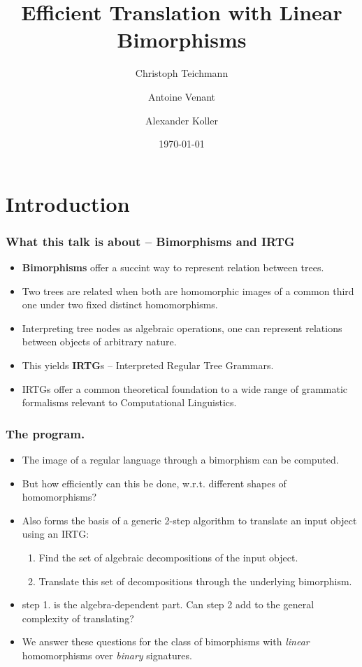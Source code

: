 \documentclass{beamer}
\begin{document}
\title{Efficient Translation with Linear Bimorphisms} 
\author[Antoine Venant]{Christoph Teichmann \and Antoine Venant \and Alexander Koller}
\date{\today}
\maketitle


\section{Introduction}

\begin{frame}
  \frametitle{What this talk is about -- Bimorphisms and IRTG}
  \begin{itemize}
  \item \textbf{Bimorphisms} offer a succint way to represent relation between trees.
  \item Two trees are related when both are homomorphic images of a common third one under two fixed distinct homomorphisms.
  \item Interpreting tree nodes as algebraic operations, one can represent relations between objects of arbitrary nature.
  \item This yields \textbf{IRTG}s -- Interpreted Regular Tree Grammars.
  \item IRTGs offer a common theoretical foundation to a wide range of grammatic formalisms relevant to Computational Linguistics.
  \end{itemize}
\end{frame}

\begin{frame}
  \frametitle{The program.}
  \begin{itemize}
  \item The image of a regular language through a bimorphism can be computed.
  \item \alert{But how efficiently can this be done, w.r.t. different shapes of homomorphisms?}
  \item Also forms the basis of a generic 2-step algorithm to translate an input object using an IRTG:
    \begin{enumerate}
    \item Find the set of algebraic decompositions of the input object.
    \item Translate this set of decompositions through the underlying bimorphism.
    \end{enumerate}
  \item \alert{step 1. is the algebra-dependent part. Can step 2 add to the general complexity of translating?}
  \item We answer these questions for the class of bimorphisms with \emph{linear} homomorphisms over \emph{binary} signatures.
  \end{itemize}
\end{frame}
\end{document}
